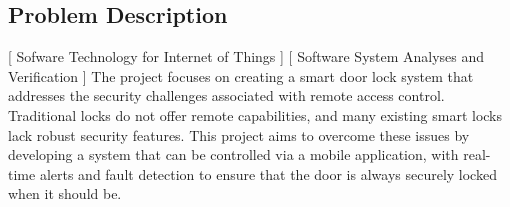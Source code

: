 \subsection{Problem Description}
[ Sofware Technology for Internet of Things ] [ Software System Analyses and Verification ]
\newline
The project focuses on creating a smart door lock system that addresses the security challenges associated with remote access control. Traditional locks do not offer remote capabilities, and many existing smart locks lack robust security features. This project aims to overcome these issues by developing a system that can be controlled via a mobile application, with real-time alerts and fault detection to ensure that the door is always securely locked when it should be.